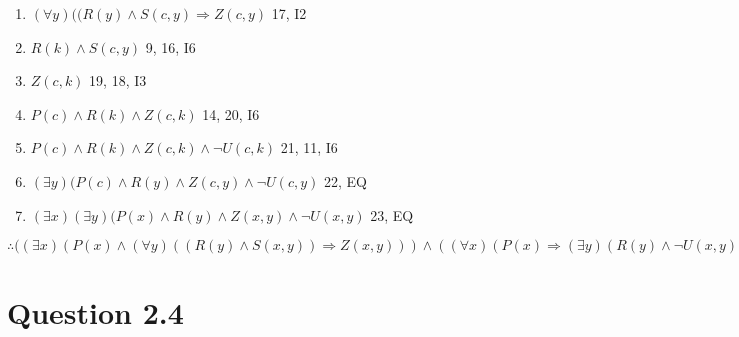 \documentclass{article}
\begin{document}
\begin{enumerate}
				\item $(\forall y)((R(y) \land S(c, y) \Rightarrow Z(c, y)$ \hfill 17, I2
				\item $R(k) \land S(c, y)$ \hfill 9, 16, I6
				\item $Z(c, k)$ \hfill 19, 18, I3
				\item $P(c) \land R(k) \land Z(c, k)$ \hfill 14, 20, I6
				\item $P(c) \land R(k) \land Z(c, k) \land \lnot U(c, k)$ \hfill 21, 11, I6
				\item $(\exists y)(P(c) \land R(y) \land Z(c, y) \land \lnot U(c, y)$ \hfill 22, EQ
				\item $(\exists x)(\exists y)(P(x) \land R(y) \land Z(x, y) \land \lnot U(x, y)$ \hfill 23, EQ
			\end{enumerate}
			$\therefore ((\exists x)(P(x) \land (\forall y)((R(y) \land S(x, y)) \Rightarrow Z(x, y))) \land ((\forall x)(P(x) \Rightarrow (\exists y)(R(y) \land \lnot U(x, y) \land T(x, y)))) \land ((\forall x)(\forall y)((P(x) \land R(y) \land T(x, y)) \Rightarrow S(x, y))) \Rightarrow ((\exists x)(\exists y)(P(x) \land R(x) \land Z(x, y) \land \lnot U(x, y)))$ \\
	\section{Question 2.4}
\end{document}
